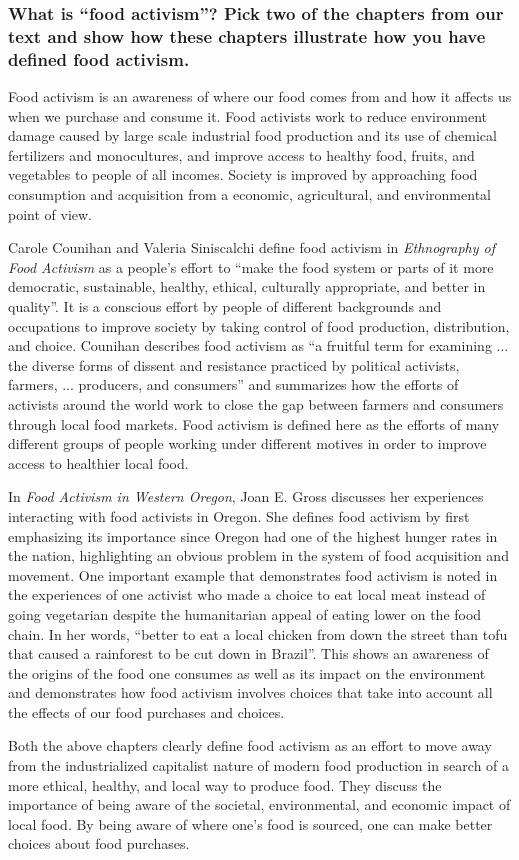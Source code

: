 \documentclass[letterpaper, 12pt]{article}
\begin{document}
\subsubsection*{What is “food activism”? Pick two of the chapters from our text
and show how these chapters illustrate how you have defined food activism.}
Food activism is an awareness of where our food comes from and how it affects
us when we purchase and consume it. Food activists work to reduce environment
damage caused by large scale industrial food production and its use of
chemical fertilizers and monocultures, and improve access to healthy food,
fruits, and vegetables to people of all incomes. Society is improved by
approaching food consumption and acquisition from a economic, agricultural, and
environmental point of view. \par
Carole Counihan and Valeria Siniscalchi define food activism in \textit{
Ethnography of Food Activism} as a people's effort to ``make the food system
or parts of it more democratic, sustainable, healthy, ethical, culturally
appropriate, and better in quality''. It is a conscious effort by people of
different backgrounds and occupations to improve society by taking control of
food production, distribution, and choice. Counihan describes food activism as
``a fruitful term for examining ... the diverse forms of dissent and resistance
practiced by political activists, farmers, ... producers, and consumers'' and
summarizes how the efforts of activists around the world work to close the gap
between farmers and consumers through local food markets. Food activism is
defined here as the efforts of many different groups of people working under
different motives in order to improve access to healthier local food. \par
In \textit{Food Activism in Western Oregon}, Joan E. Gross discusses her
experiences interacting with food activists in Oregon. She defines food
activism by first emphasizing its importance since Oregon had one of the
highest hunger rates in the nation, highlighting an obvious problem in the
system of food acquisition and movement. One important example that
demonstrates food activism is noted in the experiences of one activist who made
a choice to eat local meat instead of going vegetarian despite the humanitarian
appeal of eating lower on the food chain. In her words, ``better to eat a local
chicken from down the street than tofu that caused a rainforest to be cut down
in Brazil''. This shows an awareness of the origins of the food one consumes as
well as its impact on the environment and demonstrates how food activism
involves choices that take into account all the effects of our food purchases
and choices. \par
Both the above chapters clearly define food activism as an effort to move away
from the industrialized capitalist nature of modern food production in search
of a more ethical, healthy, and local way to produce food. They discuss the
importance of being aware of the societal, environmental, and economic impact
of local food. By being aware of where one's food is sourced, one can make
better choices about food purchases.
\end{document}
